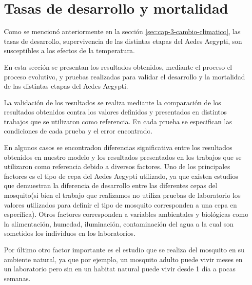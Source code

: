 \section{Tasas de desarrollo y mortalidad}

Como se mencionó anteriormente en la sección \ref{sec:cap-3-cambio-climatico}, las tasas de desarrollo,
supervivencia de las distintas etapas del Aedes Aegypti, son susceptibles a los efectos de la 
temperatura. 

En esta sección se presentan los resultados obtenidos, mediante el proceso el proceso evolutivo, y 
pruebas realizadas para validar el desarrollo y la mortalidad de las distintas etapas del Aedes Aegypti.

La validación de los resultados se realiza mediante la comparación de los resultados obtenidos contra los valores definidos y presentados en distintos trabajos que se utilizaron como referencia. En cada prueba se especifican las condiciones de cada prueba y el error encontrado.

En algunos casos se encontradon diferencias significativa entre los resultados obtenidos en nuestro modelo y los resultados presentados en los trabajos que se utilizaron como referencia debido a diversos factores.
Uno de los principales factores es el tipo de cepa del Aedes Aegypti utilizado, ya que existen estudios que demuestran la diferencia de desarrollo entre las diferentes cepas del mosquito(si bien el trabajo que realizamos no utiliza pruebas de laboratorio los valores utilizados para definir el tipo de mosquito corresponden a una cepa en específica). Otros factores corresponden a variables ambientales y biológicas como la alimentación, humedad, iluminación, contaminación del agua a la cual son sometidos los individuos en los laboratorios.

Por último otro factor importante es el estudio que se realiza del mosquito en su ambiente natural, ya que por ejemplo, un mosquito adulto puede vivir meses en un laboratorio pero sin en un habitat natural puede vivir desde 1 día a pocas semanas. 




